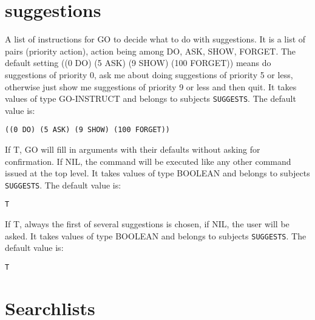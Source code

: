 \section{suggestions}

\begin{description} 
\item[GO-INSTRUCTIONS]  
A list of instructions for GO to decide what to do with suggestions.
It is a list of pairs (priority action), action being among DO, ASK, SHOW, 
FORGET.
The default setting ((0 DO) (5 ASK) (9 SHOW) (100 FORGET)) means
do suggestions of priority 0, ask me about doing suggestions of
priority 5 or less, otherwise just show me suggestions of priority
9 or less and then quit.
It takes values of type GO-INSTRUCT and belongs to subjects \texttt{SUGGESTS}.  The default value is: \begin{lstlisting}
((0 DO) (5 ASK) (9 SHOW) (100 FORGET))
\end{lstlisting}

\item[QUIETLY-USE-DEFAULTS]  
If T, GO will fill in arguments with their defaults without
asking for confirmation.  If NIL, the command will be executed like
any other command issued at the top level.
It takes values of type BOOLEAN and belongs to subjects \texttt{SUGGESTS}.  The default value is: \begin{lstlisting}
T
\end{lstlisting}

\item[RESOLVE-CONFLICT]  
If T, always the first of several suggestions is chosen,
if NIL, the user will be asked.
It takes values of type BOOLEAN and belongs to subjects \texttt{SUGGESTS}.  The default value is: \begin{lstlisting}
T
\end{lstlisting}

\item
\end{description}

\section{Searchlists}

